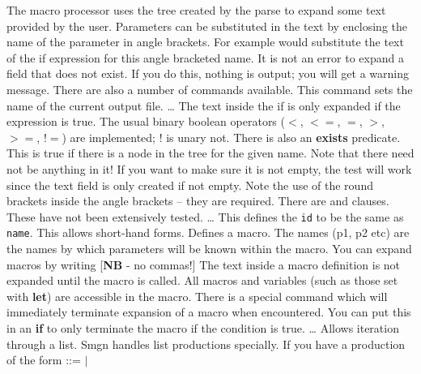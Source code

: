 
\noindent
The macro processor uses the tree created by the parse to expand some text 
provided by the user. 
\mps
Parameters can be substituted in the text by enclosing the name of the 
parameter in angle brackets. For example  
would substitute the text of the if expression for this angle bracketed name.
\mps
It is not an error to expand a field that does not exist. If you do this, 
nothing is output; you will get a warning message.
\mps
There are also a number of commands available. 
\smallskip
{}
\mps
This command sets the name of the current output file.  
\smallskip
{} \dots  {}
\mps
The text inside the if is only expanded if the expression is true. The usual 
binary boolean operators ($<$, $<=$, $=$, $>$, $>=$, $!=$) are implemented; 
! is unary not. There is also an {\bf exists} predicate.
\smallskip
{}
\mps
This is true if there is a node in the tree for the given name. Note that there 
need not be anything in it! If you want to make sure it is not empty, the test
\smallskip
{}
\mps
will work since the text field is only created if not empty.
\mps
Note the use of the round brackets inside the angle brackets -- they are required.
\mps
There are  and  clauses. These have not been 
extensively tested.
\smallskip
{} \dots {}
\mps
This defines the {\tt id} to be the same as {\tt name}. This allows short-hand 
forms.
\newpage
{}
\mps
Defines a macro. The names (p1, p2 etc) are the names by which parameters will 
be known within the macro. You can expand macros by writing
\smallskip
{} [{\bf NB} - no commas!]
\mps
The text inside a macro definition is not expanded until the macro is called. 
All macros and variables (such as those set with {\bf let}) are accessible in 
the macro.
\mps
There is a special command  which will immediately terminate 
expansion of a macro when encountered. You can put this in an {\bf if} to 
only terminate the macro if the condition is true.
\smallskip
{} \dots {}
\mps
Allows iteration through a list. Smgn handles list productions specially. 
If you have a production of the form
\smallskip
{} ::=  $|$  

